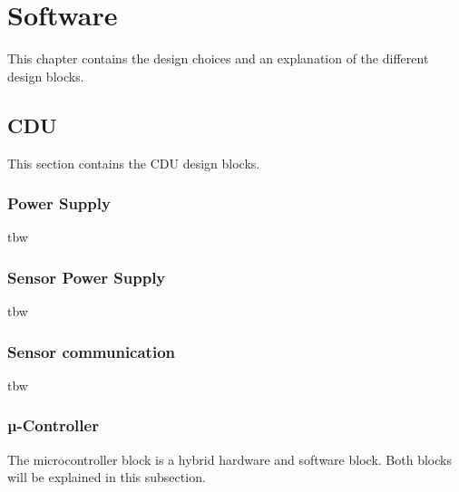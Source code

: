 \chapter{Software}
This chapter contains the design choices and an explanation of the different design blocks.

\section{CDU}
This section contains the CDU design blocks.
\subsection{Power Supply}
tbw
%

\subsection{Sensor Power Supply}
tbw

\subsection{Sensor communication}
tbw
%




\subsection{µ-Controller}
The microcontroller block is a hybrid hardware and software block. Both blocks will be explained in this subsection.
